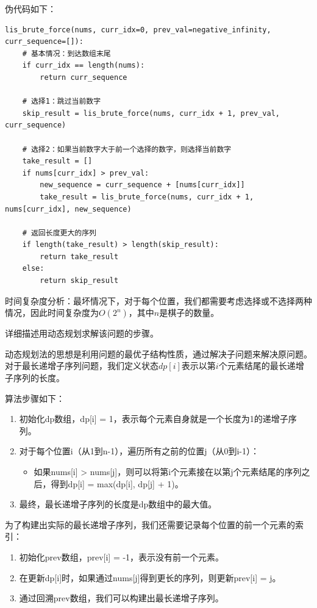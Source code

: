 \documentclass[12pt,twoside]{article}
\begin{document}
\begin{problems}
伪代码如下：
\begin{verbatim}
lis_brute_force(nums, curr_idx=0, prev_val=negative_infinity, curr_sequence=[]):
    # 基本情况：到达数组末尾
    if curr_idx == length(nums):
        return curr_sequence
    
    # 选择1：跳过当前数字
    skip_result = lis_brute_force(nums, curr_idx + 1, prev_val, curr_sequence)
    
    # 选择2：如果当前数字大于前一个选择的数字，则选择当前数字
    take_result = []
    if nums[curr_idx] > prev_val:
        new_sequence = curr_sequence + [nums[curr_idx]]
        take_result = lis_brute_force(nums, curr_idx + 1, nums[curr_idx], new_sequence)
    
    # 返回长度更大的序列
    if length(take_result) > length(skip_result):
        return take_result
    else:
        return skip_result
\end{verbatim}

时间复杂度分析：最坏情况下，对于每个位置，我们都需要考虑选择或不选择两种情况，因此时间复杂度为$O(2^n)$，其中$n$是棋子的数量。

\ppart 详细描述用动态规划求解该问题的步骤。

动态规划法的思想是利用问题的最优子结构性质，通过解决子问题来解决原问题。对于最长递增子序列问题，我们定义状态$dp[i]$表示以第$i$个元素结尾的最长递增子序列的长度。

算法步骤如下：
\begin{enumerate}
    \item 初始化dp数组，dp[i] = 1，表示每个元素自身就是一个长度为1的递增子序列。
    \item 对于每个位置i（从1到n-1），遍历所有之前的位置j（从0到i-1）：
    \begin{itemize}
        \item 如果nums[i] > nums[j]，则可以将第i个元素接在以第j个元素结尾的序列之后，得到dp[i] = max(dp[i], dp[j] + 1)。
    \end{itemize}
    \item 最终，最长递增子序列的长度是dp数组中的最大值。
\end{enumerate}

为了构建出实际的最长递增子序列，我们还需要记录每个位置的前一个元素的索引：
\begin{enumerate}
    \item 初始化prev数组，prev[i] = -1，表示没有前一个元素。
    \item 在更新dp[i]时，如果通过nums[j]得到更长的序列，则更新prev[i] = j。
    \item 通过回溯prev数组，我们可以构建出最长递增子序列。
\end{enumerate}


\end{problems}
\end{document}
